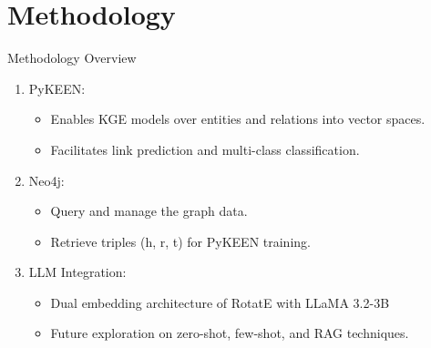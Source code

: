 \documentclass{beamer}
\begin{document}
\section{Methodology}
\begin{frame}{Methodology Overview}
    \begin{enumerate}
        \item PyKEEN: \\
              \begin{itemize}
                  \item Enables KGE models over entities and relations into vector spaces.
                  \item Facilitates link prediction and multi-class classification.
              \end{itemize}
        \item Neo4j:
              \begin{itemize}
                  \item Query and manage the graph data.
                  \item Retrieve triples (h, r, t) for PyKEEN training.
              \end{itemize}
        \item LLM Integration:
              \begin{itemize}
                  \item Dual embedding architecture of RotatE with LLaMA 3.2-3B
                  \item Future exploration on zero-shot, few-shot, and RAG techniques.
              \end{itemize}
    \end{enumerate}
\end{frame}
\end{document}
